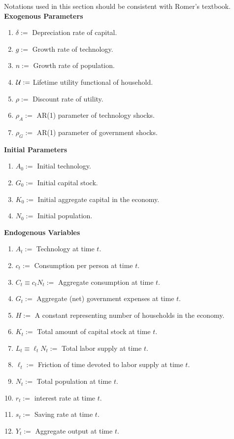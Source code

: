 \documentclass[11pt]{article}
\begin{document}
			\begin{notation} Notations used in this section should be consistent with Romer's textbook.
				\textbf{Exogenous Parameters}
					\begin{enumerate}
						\item $\delta :=$ Depreciation rate of capital.
						\item $g :=$ Growth rate of technology.
						\item $n :=$ Growth rate of population.
						\item $\mathcal{{U}} :=$ Lifetime utility functional of household.
						\item $\rho :=$ Discount rate of utility.
						\item $\rho_A :=$ AR(1) parameter of technology shocks.
						\item $\rho_G :=$ AR(1) parameter of government shocks.
					\end{enumerate}
				\textbf{Initial Parameters}
					\begin{enumerate}
						\item $A_0 :=$ Initial technology.
						\item $G_0 :=$ Initial capital stock.
						\item $K_0 :=$ Initial aggregate capital in the economy.
						\item $N_0 :=$ Initial population.
					\end{enumerate}
				\textbf{Endogenous Variables}
					\begin{enumerate}
						\item $A_t := $ Technology at time $t$.
						\item $c_t :=$ Consumption per person at time $t$.
						\item $C_t \equiv c_t N_t :=$ Aggregate consumption at time $t$.
						\item $G_t :=$ Aggregate (net) government expenses at time $t$.
						\item $H :=$ A constant representing number of households in the economy.
						\item $K_t :=$ Total amount of capital stock at time $t$.
						\item $L_t \equiv \ell_t N_t :=$ Total labor supply at time $t$.
						\item $\ell_t :=$ Friction of time devoted to labor supply at time $t$.
						\item $N_t :=$ Total population at time $t$.
						\item $r_t :=$ interest rate at time $t$.
						\item $s_t :=$ Saving rate at time $t$.
						\item $Y_t :=$ Aggregate output at time $t$.
					\end{enumerate}
			\end{notation}
		
\end{document}
